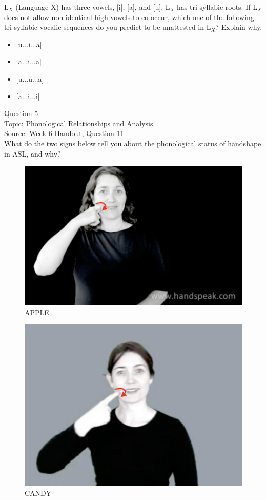 \documentclass[12pt]{article}
\begin{document}
L$_X$ (Language X) has three vowels, [i], [a], and [u]. L$_X$ has tri-syllabic roots. If L$_X$ does not allow non-identical high vowels to co-occur, which one of the following tri-syllabic vocalic sequences do you predict to be unattested in L$_X$? Explain why.\\

\begin{itemize} \item {[u...i...a]} \item {[a...i...a]} \item {[u...u...a]} \item {[a...i...i]} \end{itemize}


\newpage

{\large Question 5}\\

Topic: Phonological Relationships and Analysis\\
Source: Week 6 Handout, Question 11\\

What do the two signs below tell you about the phonological status of \underline{handshape} in ASL, and why?\\

\begin{figure}[H]
\includegraphics{../images/asl_apple.png}
\caption{APPLE}
\end{figure}
\begin{figure}[H]
\includegraphics{../images/asl_candy.png}
\caption{CANDY}
\end{figure}
\end{document}

